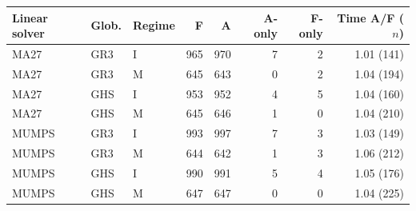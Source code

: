 \begin{tabular}{@{}lllrrrrr@{}}
\toprule
Linear solver & Glob. & Regime & F & A & A-only & F-only & Time A/F ($n$)\\
\midrule
MA27 & GR3 & I & 965 & 970 & 7 & 2 & 1.01 (141)\\
MA27 & GR3 & M & 645 & 643 & 0 & 2 & 1.04 (194)\\
MA27 & GHS & I & 953 & 952 & 4 & 5 & 1.04 (160)\\
MA27 & GHS & M & 645 & 646 & 1 & 0 & 1.04 (210)\\
MUMPS & GR3 & I & 993 & 997 & 7 & 3 & 1.03 (149)\\
MUMPS & GR3 & M & 644 & 642 & 1 & 3 & 1.06 (212)\\
MUMPS & GHS & I & 990 & 991 & 5 & 4 & 1.05 (176)\\
MUMPS & GHS & M & 647 & 647 & 0 & 0 & 1.04 (225)\\
\bottomrule
\end{tabular}
